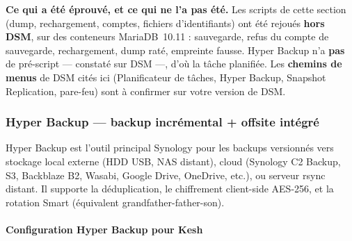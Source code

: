 \documentclass[a4paper,11pt,oneside]{article}
\begin{document}
\begin{keshnote}
\textbf{Ce qui a été éprouvé, et ce qui ne l'a pas été.} Les scripts de cette section (dump, rechargement, comptes, fichiers d'identifiants) ont été rejoués \textbf{hors DSM}, sur des conteneurs MariaDB~10.11 : sauvegarde, refus du compte de sauvegarde, rechargement, dump raté, empreinte fausse. Hyper Backup n'a \textbf{pas} de pré-script --- constaté sur DSM ---, d'où la tâche planifiée. Les \textbf{chemins de menus} de DSM cités ici (Planificateur de tâches, Hyper Backup, Snapshot Replication, pare-feu) sont à confirmer sur votre version de DSM.
\end{keshnote}

\subsubsection{Hyper Backup — backup incrémental + offsite intégré}

Hyper Backup est l'outil principal Synology pour les backups versionnés vers stockage local externe (HDD USB, NAS distant), cloud (Synology C2 Backup, S3, Backblaze B2, Wasabi, Google Drive, OneDrive, etc.), ou serveur rsync distant. Il supporte la déduplication, le chiffrement client-side AES-256, et la rotation Smart (équivalent grandfather-father-son).

\paragraph{Configuration Hyper Backup pour Kesh}
\end{document}
